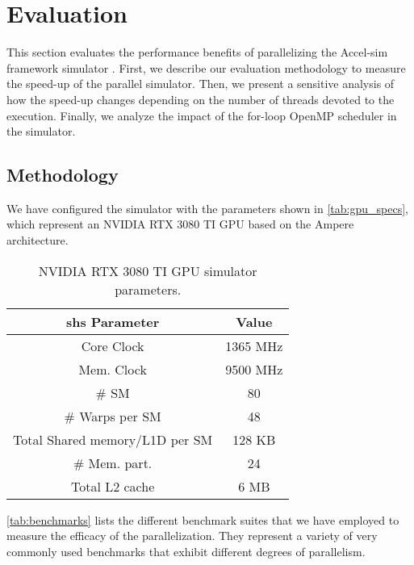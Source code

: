 \section{Evaluation}\label{sec:evaluation}

\par
This section evaluates the performance benefits of parallelizing the Accel-sim framework simulator \cite{accelsim}. First, we describe our evaluation methodology to measure the speed-up of the parallel simulator. Then, we present a sensitive analysis of how the speed-up changes depending on the number of threads devoted to the execution. Finally, we analyze the impact of the for-loop OpenMP scheduler in the simulator.

\subsection{Methodology}

\par
We have configured the simulator with the parameters shown in \autoref{tab:gpu_specs}, which represent an NVIDIA RTX 3080 TI GPU based on the Ampere architecture. 

\begin{table}
    \centering
    \begin{tabular}{ |c|c|  }
    \hline
shs 
Parameter & Value \\
    \hline
    Core Clock & 1365 MHz \\
    Mem. Clock & 9500 MHz \\
    \# SM & 80 \\
    \# Warps per SM & 48  \\
    Total Shared memory/L1D per SM & 128 KB \\
    \# Mem. part. & 24 \\
    Total L2 cache  & 6 MB \\
    \hline
    \end{tabular}
    \caption{NVIDIA RTX 3080 TI GPU simulator parameters.}
    \label{tab:gpu_specs}
\end{table}

\par
\autoref{tab:benchmarks} lists the different benchmark suites that we have employed to measure the efficacy of the parallelization. They represent a variety of very commonly used benchmarks that exhibit different degrees of parallelism.

